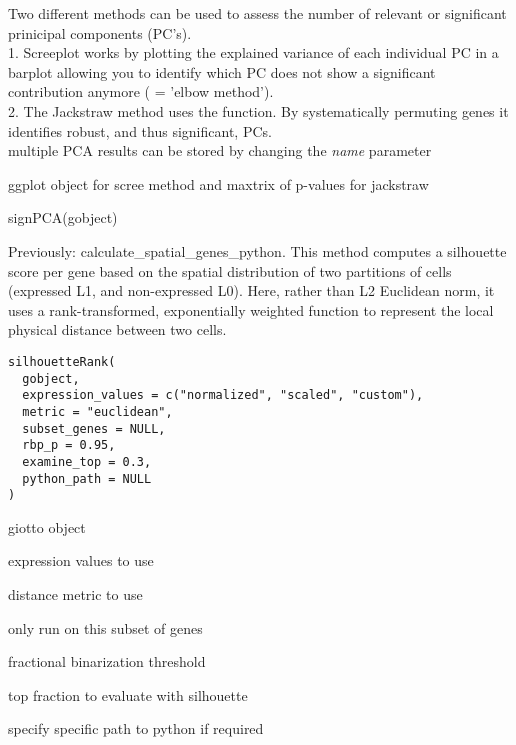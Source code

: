 \documentclass[a4paper]{book}
\begin{document}
%
\begin{Details}\relax
Two different methods can be used to assess the number of relevant or significant
prinicipal components (PC's). \\{}
1. Screeplot works by plotting the explained variance of each
individual PC in a barplot allowing you to identify which PC does not show a significant
contribution anymore ( = 'elbow method'). \\{}
2. The Jackstraw method uses the  function. By
systematically permuting genes it identifies robust, and thus significant, PCs.
\\{} multiple PCA results can be stored by changing the \emph{name} parameter
\end{Details}
%
\begin{Value}
ggplot object for scree method and maxtrix of p-values for jackstraw
\end{Value}
%
\begin{Examples}
\begin{ExampleCode}
    signPCA(gobject)
\end{ExampleCode}
\end{Examples}
%
\begin{Description}\relax
Previously: calculate\_spatial\_genes\_python. This method computes a silhouette score per gene based on the
spatial distribution of two partitions of cells (expressed L1, and non-expressed L0).
Here, rather than L2 Euclidean norm, it uses a rank-transformed, exponentially weighted
function to represent the local physical distance between two cells.
\end{Description}
%
\begin{Usage}
\begin{verbatim}
silhouetteRank(
  gobject,
  expression_values = c("normalized", "scaled", "custom"),
  metric = "euclidean",
  subset_genes = NULL,
  rbp_p = 0.95,
  examine_top = 0.3,
  python_path = NULL
)
\end{verbatim}
\end{Usage}
%
\begin{Arguments}
\begin{ldescription}
\item[\code{gobject}] giotto object

\item[\code{expression\_values}] expression values to use

\item[\code{metric}] distance metric to use

\item[\code{subset\_genes}] only run on this subset of genes

\item[\code{rbp\_p}] fractional binarization threshold

\item[\code{examine\_top}] top fraction to evaluate with silhouette

\item[\code{python\_path}] specify specific path to python if required
\end{ldescription}
\end{Arguments}
\end{document}
